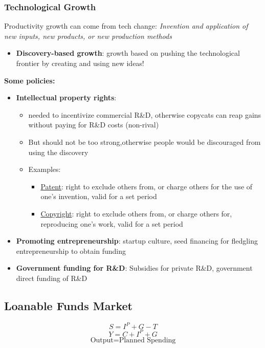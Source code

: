 \documentclass{article}
\begin{document}
\begin{multicols}{2}
\subsubsection{Technological Growth}
Productivity growth can come from tech change: \textit{Invention and application of new inputs, new products, or new production methods}
\begin{itemize}
	\item \textbf{Discovery-based growth}: growth based on pushing the technological frontier by creating and using new ideas!
\end{itemize}
\textbf{Some policies:}
\begin{itemize}
	\item \textbf{Intellectual property rights}:
	\begin{itemize}
		\item needed to incentivize commercial R\&D, otherwise copycats can reap gains without paying for R\&D costs (non-rival)
		\item But should not be too strong,otherwise people would be discouraged from using the discovery
		\item Examples:
		\begin{itemize}
			\item \underline{Patent}: right to exclude others from, or charge others for the use of one's invention, valid for a set period
			\item \underline{Copyright}: right to exclude others from, or charge others for, reproducing one's work, valid for a set period
		\end{itemize}
	\end{itemize}
    \item \textbf{Promoting entrepreneurship}: startup culture, seed financing for fledgling entrepreneurship to obtain funding
    \item \textbf{Government funding for R\&D}: Subsidies for private R\&D, government direct funding of R\&D
\end{itemize}
\subsection{Loanable Funds Market}
$$S = I^P + G - T$$
$$Y = C+ I^P + G$$
$$\text{Output} = \text{Planned Spending}$$

\end{multicols}
\end{document}
